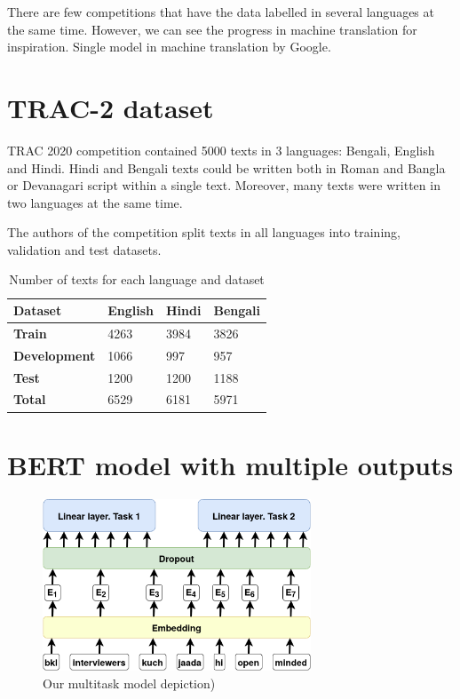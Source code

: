 \documentclass[10pt, a4paper]{article}
\begin{document}
There are few competitions that have the data labelled in several languages at the same time. However, we can see the progress in machine translation for inspiration. Single model in machine translation by Google.
\section{TRAC-2 dataset}
TRAC 2020 competition contained 5000 texts in 3 languages: Bengali, English and Hindi. Hindi and Bengali texts could be written both in Roman and Bangla or Devanagari script within a single text. Moreover, many texts were written in two languages at the same time.

The authors of the competition split texts in all languages into training, validation and test datasets.
\begin{table}[h]
	\begin{tabular}{|l|lll|}
		\hline
		\bf Dataset & \bf English & \bf Hindi & \bf Bengali\\ 
		\hline
		\hline
\bf Train & 	  4263 & 3984 & 3826\\  \hline
\bf Development & 1066 & 997  & 957\\  \hline
\bf Test & 		  1200 & 1200 & 1188\\ \hline\hline
\bf Total &       6529 & 6181 & 5971\\ \hline
	\end{tabular}
	\caption{Number of texts for each language and dataset}
	\label{tab:dataset}
\end{table}

\section{BERT model with multiple outputs}

\begin{figure}[tbh]
	\begin{center}
		\includegraphics[width=8cm]{pics/bert}
		\caption{Our multitask model depiction)}
		\label{fig:bert}
	\end{center}
\end{figure}
\end{document}
